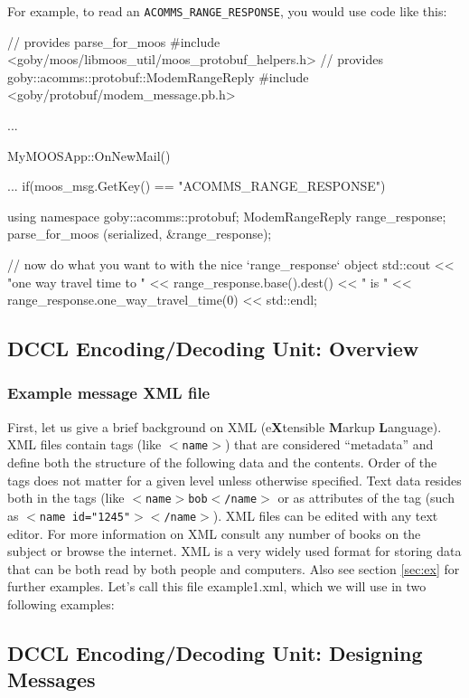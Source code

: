 \documentclass[11pt, letterpaper, oneside]{memoir}
\newcommand{\xmltag}[1]{\texttt{$<$#1$>$}}
\begin{document}
For example, to read an \verb|ACOMMS_RANGE_RESPONSE|, you would use code like this:
\begin{boxedverbatim}
// provides parse_for_moos
#include <goby/moos/libmoos_util/moos_protobuf_helpers.h>
// provides goby::acomms::protobuf::ModemRangeReply
#include <goby/protobuf/modem_message.pb.h>

...

MyMOOSApp::OnNewMail()
{
  ...
  if(moos_msg.GetKey() == "ACOMMS_RANGE_RESPONSE")
  {
    using namespace goby::acomms::protobuf;
    ModemRangeReply range_response;
    parse_for_moos (serialized, &range_response);
    
    // now do what you want to with the nice `range_response` object
    std::cout << "one way travel time to " << range_response.base().dest() 
              << " is " << range_response.one_way_travel_time(0) << std::endl;
  }
}
\end{boxedverbatim}
\resetbvlinenumber


\subsection{DCCL Encoding/Decoding Unit: Overview} \label{sec:dccl_overview}

\subsubsection{Example message XML file} \label{sec:ex_xml}

 First, let us give a brief background on XML (e\textbf{X}tensible \textbf{M}arkup
 \textbf{L}anguage). XML files contain tags (like
 \xmltag{name}) that are considered ``metadata'' and define both
 the structure of the following data and the contents. Order of the
 tags does not matter for a given level unless otherwise
 specified. Text data resides both in the tags (like
 \xmltag{name$>$bob$<$/name} or as attributes of the tag (such as
 \xmltag{name id="1245"$><$/name}). XML files can be edited with any
 text editor. For more information on XML consult any number of books
 on the subject or browse the internet. XML is a very widely used
 format for storing data that can be both read by both people and
 computers. Also see section \ref{sec:ex} for further examples. Let's call this file example1.xml, which we will use in two following examples:

\resetbvlinenumber

\subsection{DCCL Encoding/Decoding Unit: Designing Messages}
\end{document}
